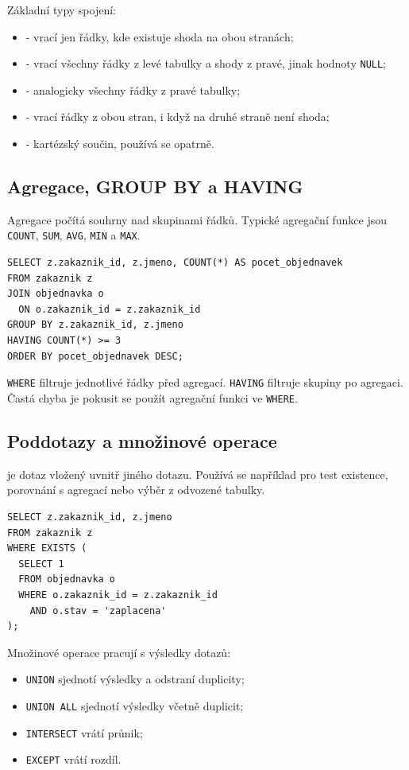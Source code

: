 Základní typy spojení:
\begin{itemize}
  \item {} - vrací jen řádky, kde existuje shoda na obou stranách;
  \item {} - vrací všechny řádky z levé tabulky a shody z pravé, jinak hodnoty
  \texttt{NULL};
  \item {} - analogicky všechny řádky z pravé tabulky;
  \item {} - vrací řádky z obou stran, i když na druhé straně není shoda;
  \item {} - kartézský součin, používá se opatrně.
\end{itemize}

\subsection{Agregace, GROUP BY a HAVING}
Agregace počítá souhrny nad skupinami řádků. Typické agregační funkce jsou \texttt{COUNT},
\texttt{SUM}, \texttt{AVG}, \texttt{MIN} a \texttt{MAX}.

{\small
\begin{verbatim}
SELECT z.zakaznik_id, z.jmeno, COUNT(*) AS pocet_objednavek
FROM zakaznik z
JOIN objednavka o
  ON o.zakaznik_id = z.zakaznik_id
GROUP BY z.zakaznik_id, z.jmeno
HAVING COUNT(*) >= 3
ORDER BY pocet_objednavek DESC;
\end{verbatim}
}

\texttt{WHERE} filtruje jednotlivé řádky před agregací. \texttt{HAVING} filtruje skupiny po agregaci.
Častá chyba je pokusit se použít agregační funkci ve \texttt{WHERE}.

\subsection{Poddotazy a množinové operace}
 je dotaz vložený uvnitř jiného dotazu. Používá se například pro test existence,
porovnání s agregací nebo výběr z odvozené tabulky.

{\small
\begin{verbatim}
SELECT z.zakaznik_id, z.jmeno
FROM zakaznik z
WHERE EXISTS (
  SELECT 1
  FROM objednavka o
  WHERE o.zakaznik_id = z.zakaznik_id
    AND o.stav = 'zaplacena'
);
\end{verbatim}
}

Množinové operace pracují s výsledky dotazů:
\begin{itemize}
  \item \texttt{UNION} sjednotí výsledky a odstraní duplicity;
  \item \texttt{UNION ALL} sjednotí výsledky včetně duplicit;
  \item \texttt{INTERSECT} vrátí průnik;
  \item \texttt{EXCEPT} vrátí rozdíl.
\end{itemize}

